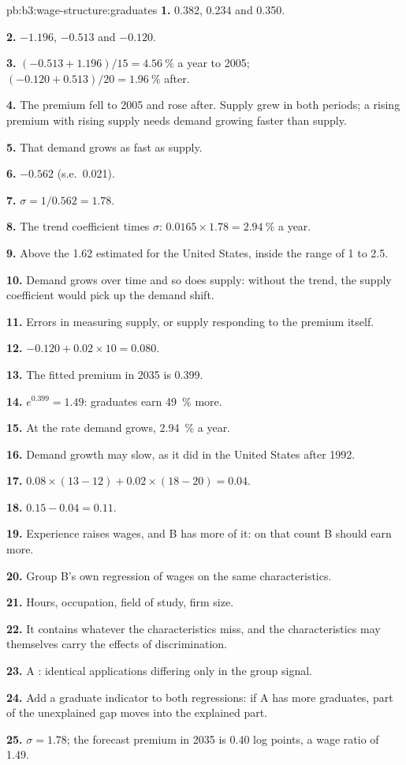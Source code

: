 \begin{solution}{pb:b3:wage-structure:graduates}
\textbf{1.} 0.382, 0.234 and 0.350.

\textbf{2.} $-1.196$, $-0.513$ and $-0.120$.

\textbf{3.} $(-0.513 + 1.196)/15 = 4.56~\%$ a year to 2005; $(-0.120 + 0.513)/20 = 1.96~\%$ after.

\textbf{4.} The premium fell to 2005 and rose after. Supply grew in both periods; a rising
premium with rising supply needs demand growing faster than supply.

\textbf{5.} That demand grows as fast as supply.

\textbf{6.} $-0.562$ (s.e.\ 0.021).

\textbf{7.} $\sigma = 1/0.562 = 1.78$.

\textbf{8.} The trend coefficient times $\sigma$: $0.0165 \times 1.78 = 2.94~\%$ a year.

\textbf{9.} Above the 1.62 estimated for the United States, inside the range of 1 to 2.5.

\textbf{10.} Demand grows over time and so does supply: without the trend, the supply
coefficient would pick up the demand shift.

\textbf{11.} Errors in measuring supply, or supply responding to the premium itself.

\textbf{12.} $-0.120 + 0.02 \times 10 = 0.080$.

\textbf{13.} The fitted premium in 2035 is 0.399.

\textbf{14.} $e^{0.399} = 1.49$: graduates earn 49~\% more.

\textbf{15.} At the rate demand grows, 2.94~\% a year.

\textbf{16.} Demand growth may slow, as it did in the United States after 1992.

\textbf{17.} $0.08 \times (13 - 12) + 0.02 \times (18 - 20) = 0.04$.

\textbf{18.} $0.15 - 0.04 = 0.11$.

\textbf{19.} Experience raises wages, and B has more of it: on that count B should earn more.

\textbf{20.} Group B's own regression of wages on the same characteristics.

\textbf{21.} Hours, occupation, field of study, firm size.

\textbf{22.} It contains whatever the characteristics miss, and the characteristics may
themselves carry the effects of discrimination.

\textbf{23.} A : identical applications differing only in the group
signal.

\textbf{24.} Add a graduate indicator to both regressions: if A has more graduates,
part of the unexplained gap moves into the explained part.

\textbf{25.} $\sigma = 1.78$; the forecast premium in 2035 is 0.40 log points, a wage ratio of 1.49.
\end{solution}
